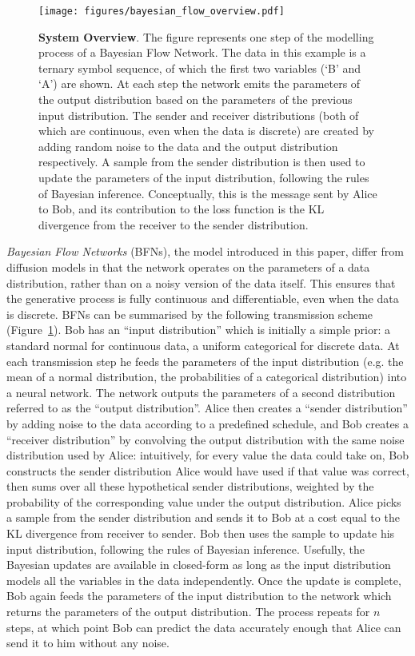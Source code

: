 \documentclass[11pt,table]{article}
\newcommand{\0}[1]{\constvec{0}{#1}}
\newcommand{\1}[1]{\constvec{1}{#1}}
\begin{document}
\begin{figure}[t!] 
    \texttt{[image: figures/bayesian\_flow\_overview.pdf]}
\caption{\textbf{System Overview}. The figure represents one step of the modelling process of a Bayesian Flow Network. The data in this example is a ternary symbol sequence, of which the first two variables (`B' and `A') are shown.  At each step the network emits the parameters of the output distribution based on the parameters of the previous input distribution.  The sender and receiver distributions (both of which are continuous, even when the data is discrete) are created by adding random noise to the data and the output distribution respectively.  A sample from the sender distribution is then used to update the parameters of the input distribution, following the rules of Bayesian inference. Conceptually, this is the message sent by Alice to Bob, and its contribution to the loss function is the KL divergence from the receiver to the sender distribution.}
\label{fig:overview}
\end{figure}

\emph{Bayesian Flow Networks} (BFNs), the model introduced in this paper, differ from diffusion models in that the network operates on the parameters of a data distribution, rather than on a noisy version of the data itself.
This ensures that the generative process is fully continuous and differentiable, even when the data is discrete.
BFNs can be summarised by the following transmission scheme (Figure~\ref{fig:overview}).
Bob has an ``input distribution'' which is initially a simple prior: a standard normal for continuous data, a uniform categorical for discrete data.
At each transmission step he feeds the parameters of the input distribution (e.g. the mean of a normal distribution, the probabilities of a categorical distribution) into a neural network.
The network outputs the parameters of a second distribution referred to as the ``output distribution''.
Alice then creates a ``sender distribution'' by adding noise to the data according to a predefined schedule, and Bob creates a ``receiver distribution'' by convolving the output distribution with the same noise distribution used by Alice: intuitively, for every value the data could take on, Bob constructs the sender distribution Alice would have used if that value was correct, then sums over all these hypothetical sender distributions, weighted by the probability of the corresponding value under the output distribution.
Alice picks a sample from the sender distribution and sends it to Bob at a cost equal to the KL divergence from receiver to sender.
Bob then uses the sample to update his input distribution, following the rules of Bayesian inference.
Usefully, the Bayesian updates are available in closed-form as long as the input distribution models all the variables in the data independently.
Once the update is complete, Bob again feeds the parameters of the input distribution to the network which returns the parameters of the output distribution.
The process repeats for $n$ steps, at which point Bob can predict the data accurately enough that Alice can send it to him without any noise.
\end{document}
